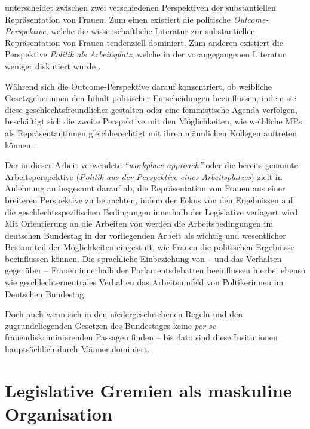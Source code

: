 \documentclass[12pt, 
    twoside=false, 
    bibliography=totoc, 
    numbers=endperiod, 
    headings=normal, 
    toc=chapterentrydotfill
    ]{scrbook}
\begin{document}
\textcites{dahlerup_2006}{dahlerup_1988} unterscheidet zwischen zwei verschiedenen Perspektiven der substantiellen Repräsentation von Frauen. Zum einen existiert die politische \emph{Outcome-Perspektive}, welche die wissenschaftliche Literatur zur substantiellen Repräsentation von Frauen tendenziell dominiert. Zum anderen existiert die Perspektive \emph{Politik als Arbeitsplatz}, welche in der vorangegangenen Literatur weniger diskutiert wurde \parencites[513]{dahlerup_2006}[199]{erikson_2018}. 

Während sich die Outcome-Perspektive darauf konzentriert, ob weibliche Gesetzgeberinnen den Inhalt politischer Entscheidungen beeinflussen, indem sie diese geschlechtsfreundlicher gestalten oder eine feministische Agenda verfolgen, beschäftigt sich die zweite Perspektive mit den Möglichkeiten, wie weibliche MPs als Repräsentantinnen gleichberechtigt mit ihren männlichen Kollegen auftreten können \parencites[199]{erikson_2018}{dahlerup_2006}{dahlerup_1988}.

Der in dieser Arbeit verwendete \emph{\enquote{workplace approach}} oder die bereits genannte Arbeitsperspektive  (\emph{Politik aus der Perspektive eines Arbeitsplatzes}) zielt in Anlehnung an \textcite{erikson_2018} insgesamt darauf ab, die Repräsentation von Frauen aus einer breiteren Perspektive zu betrachten, indem der Fokus von den Ergebnissen auf die geschlechtsspezifischen Bedingungen innerhalb der Legislative verlagert wird. Mit Orientierung an die Arbeiten von \textcites{dahlerup_2006}{dahlerup_1988}{erikson_2018} werden die  Arbeitsbedingungen im deutschen Bundestag in der vorliegenden Arbeit als wichtig und wesentlicher Bestandteil der Möglichkeiten eingestuft, wie Frauen die politischen Ergebnisse beeinflussen können. Die sprachliche Einbeziehung von -- und das Verhalten gegenüber -- Frauen innerhalb der Parlamentsdebatten beeinflussen hierbei ebenso wie geschlechterneutrales Verhalten das Arbeitsumfeld von Poltikerinnen im Deutschen Bundestag.

Doch auch wenn sich in den niedergeschriebenen Regeln und den zugrundeliegenden Gesetzen des Bundestages keine \emph{per se} frauendiskriminierenden Passagen finden -- bis dato sind diese Insitutionen hauptsächlich durch Männer dominiert.

\section{Legislative Gremien als maskuline Organisation}
\end{document}
